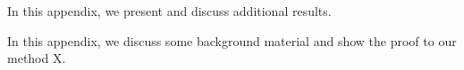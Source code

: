 
In this appendix, we present and discuss additional results.


In this appendix, we discuss some background material and show the proof to our method X.
